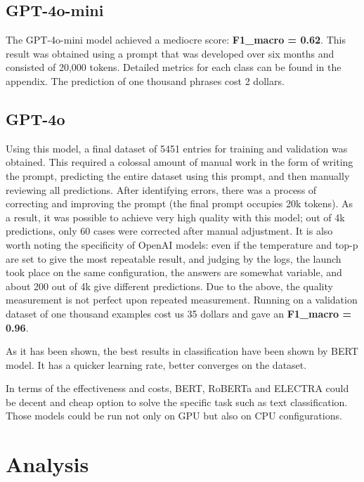 \documentclass[11pt]{article}
\begin{document}
\subsection{GPT-4o-mini}
The GPT-4o-mini model achieved a mediocre score: \textbf{F1\_macro = 0.62}. This result was obtained using a prompt that was developed over six months and consisted of 20,000 tokens. Detailed metrics for each class can be found in the appendix. The prediction of one thousand phrases cost 2 dollars.

\subsection{GPT-4o}
Using this model, a final dataset of 5451 entries for training and validation was obtained. This required a colossal amount of manual work in the form of writing the prompt, predicting the entire dataset using this prompt, and then manually reviewing all predictions. After identifying errors, there was a process of correcting and improving the prompt (the final prompt occupies 20k tokens). As a result, it was possible to achieve very high quality with this model; out of 4k predictions, only 60 cases were corrected after manual adjustment. It is also worth noting the specificity of OpenAI models: even if the temperature and top-p are set to give the most repeatable result, and judging by the logs, the launch took place on the same configuration, the answers are somewhat variable, and about 200 out of 4k give different predictions. Due to the above, the quality measurement is not perfect upon repeated measurement. Running on a validation dataset of one thousand examples cost us 35 dollars and gave an \textbf{F1\_macro = 0.96}.


As it has been shown, the best results in classification have been shown by BERT model. It has a quicker learning rate, better converges on the dataset.

In terms of the effectiveness and costs, BERT, RoBERTa and ELECTRA could be decent and cheap option to solve the specific task such as text classification. Those models could be run not only on GPU but also on CPU configurations.

\section{Analysis} 

\end{document}
